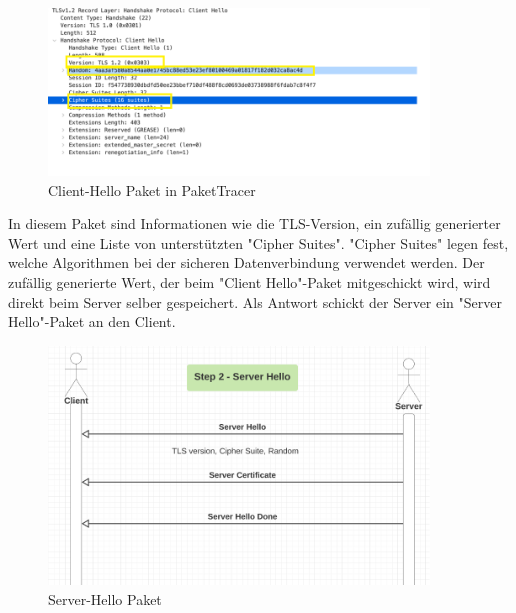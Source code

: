 \begin{figure}[H]
    \centering
    \includegraphics[width=0.9\textwidth]{media/OpenSSL/pt.png}
    \caption{Client-Hello Paket in PaketTracer \cite{DeepDiveTLS}}
\end{figure}

In diesem Paket sind Informationen wie die TLS-Version, ein zufällig generierter Wert und eine Liste von unterstützten "Cipher Suites". "Cipher Suites" legen fest, welche Algorithmen bei der sicheren Datenverbindung verwendet werden. Der zufällig generierte Wert, der beim "Client Hello"-Paket mitgeschickt wird, wird direkt beim Server selber gespeichert. Als Antwort schickt der Server ein "Server Hello"-Paket an den Client. 

\begin{figure}[H]
    \centering
    \includegraphics[width=0.9\textwidth]{media/OpenSSL/hello.png}
    \caption{Server-Hello Paket \cite{DeepDiveTLS}} 
\end{figure}


